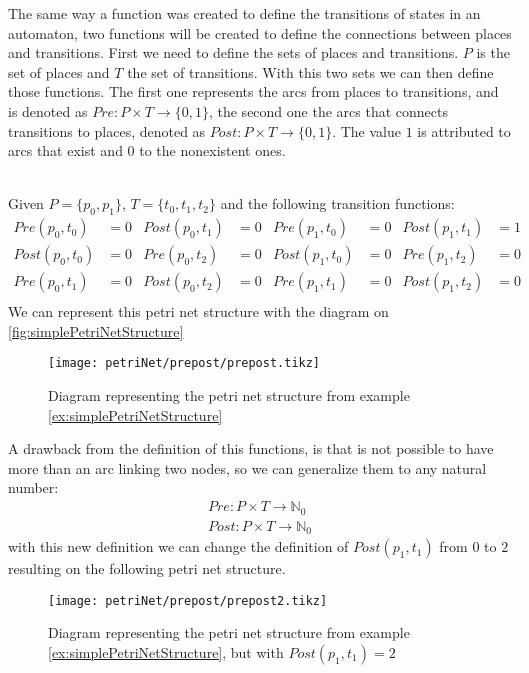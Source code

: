The same way a function was created to define the transitions of states in an
automaton, two functions will be created to define the connections between places
and transitions. First we need to define the sets of places and transitions. $P$
is the set of places and $T$ the set of transitions. With this two sets we can
then define those functions. The first one represents the arcs
from places to transitions, and is denoted as $Pre: P \times T \rightarrow
\{0, 1\}$, the second one the arcs that connects transitions to places, denoted
as $Post: P \times T \rightarrow \{0,1\}$. The value $1$ is attributed to arcs
that exist and $0$ to the nonexistent ones.


\begin{example} ~\\
  \label{ex:simplePetriNetStructure}
  Given $P = \{p_0,p_1\}$, $T = \{t_0,t_1,t_2\}$ and the following transition
  functions:
  \begin{align*}
   Pre(p_0,t_0)& = 0  &  Post(p_0,t_1) &= 0 & Pre(p_1,t_0) &= 0 &  Post(p_1,t_1) &= 1 \\
   Post(p_0,t_0) &= 0  &    Pre(p_0,t_2) &= 0   & Post(p_1,t_0) &= 0   & Pre(p_1,t_2) &= 0\\
   Pre(p_0,t_1) &= 0    &  Post(p_0,t_2) &= 0  &  Pre(p_1,t_1) &= 0     &Post(p_1,t_2) &= 0\\
  \end{align*}
  We can represent this petri net structure with the diagram on \autoref{fig:simplePetriNetStructure}
\end{example}
\begin{figure}[H]
  \centering
  \texttt{[image: petriNet/prepost/prepost.tikz]}
  \caption{Diagram representing the petri net structure from example \ref{ex:simplePetriNetStructure}}
\label{fig:simplePetriNetStructure}
\end{figure}
A drawback from the definition of this functions, is that is not possible to
have more than an arc linking two nodes, so we can generalize them to any natural number:
\begin{align*}
  Pre:  P \times T \rightarrow \mathbb{N}_0\\
  Post: P \times T \rightarrow \mathbb{N}_0
\end{align*}
with this new definition we can change the definition of $Post(p_1,t_1)$ from
$0$ to $2$ resulting on the following petri net structure.
\begin{figure}[H]
  \centering
  \texttt{[image: petriNet/prepost/prepost2.tikz]}
  \caption{Diagram representing the petri net structure from example
    \ref{ex:simplePetriNetStructure}, but with $Post(p_1,t_1)=2$}
\label{fig:simplePetriNetStructureNatural}
\end{figure}
